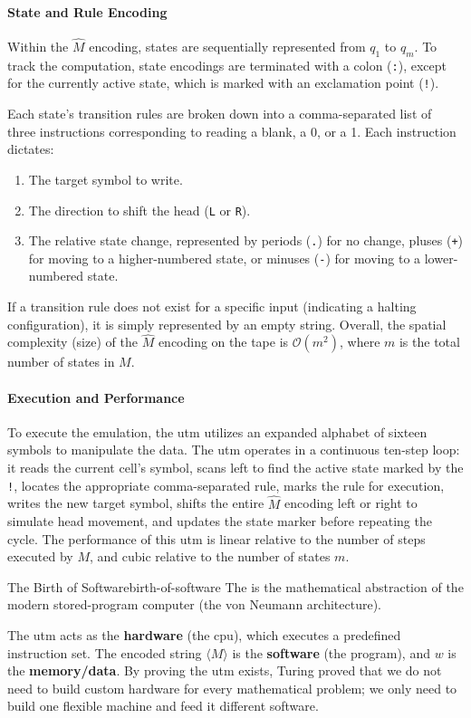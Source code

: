 \paragraph{State and Rule Encoding}
Within the \(\hat{M}\) encoding, states are sequentially represented from \(q_1\) to \(q_m\). To track the computation, state encodings are terminated with a colon (\texttt{:}), except for the currently active state, which is marked with an exclamation point (\texttt{!}). 

Each state's transition rules are broken down into a comma-separated list of three instructions corresponding to reading a blank, a 0, or a 1. Each instruction dictates:
\begin{enumerate}
    \item The target symbol to write.
    \item The direction to shift the head (\texttt{L} or \texttt{R}).
    \item The relative state change, represented by periods (\texttt{.}) for no change, pluses (\texttt{+}) for moving to a higher-numbered state, or minuses (\texttt{-}) for moving to a lower-numbered state.
\end{enumerate}
If a transition rule does not exist for a specific input (indicating a halting configuration), it is simply represented by an empty string. Overall, the spatial complexity (size) of the \(\hat{M}\) encoding on the tape is \(\mathcal{O}(m^2)\), where \(m\) is the total number of states in \(M\).

\paragraph{Execution and Performance}
To execute the emulation, the \gls{utm} utilizes an expanded alphabet of sixteen symbols to manipulate the data. The \gls{utm} operates in a continuous ten-step loop: it reads the current cell's symbol, scans left to find the active state marked by the \texttt{!}, locates the appropriate comma-separated rule, marks the rule for execution, writes the new target symbol, shifts the entire \(\hat{M}\) encoding left or right to simulate head movement, and updates the state marker before repeating the cycle. The performance of this \gls{utm} is linear relative to the number of steps executed by \(M\), and cubic relative to the number of states \(m\).

\begin{concept}{The Birth of Software}{birth-of-software}
    The  is the mathematical abstraction of the modern stored-program computer (the von Neumann architecture). 
    
    The \gls{utm} acts as the \textbf{hardware} (the \gls{cpu}), which executes a predefined instruction set. The encoded string \(\langle M \rangle\) is the \textbf{software} (the program), and \(w\) is the \textbf{memory/data}. By proving the \gls{utm} exists, Turing proved that we do not need to build custom hardware for every mathematical problem; we only need to build one flexible machine and feed it different software.
\end{concept}

